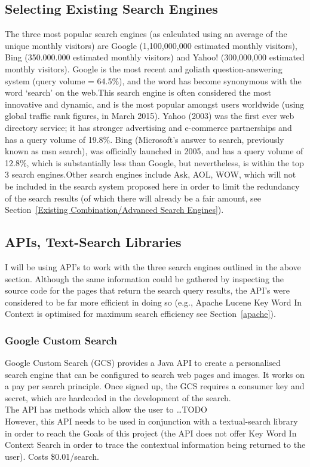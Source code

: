 \documentclass[10pt]{article}
\begin{document}
\subsection{Selecting Existing Search Engines}
The three most popular search engines (as calculated using an average of the unique monthly visitors) are Google (1,100,000,000 estimated monthly visitors), Bing (350.000.000 estimated monthly visitors) and Yahoo! (300,000,000 estimated monthly visitors)\cite{ebiz}. Google is the most recent and goliath question-answering system (query volume = 64.5\%)\cite{adam}, and the word has become synonymous with the word ‘search’ on the web.This search engine is often considered the most innovative and dynamic, and is the most popular amongst users worldwide (using global traffic rank figures, in March 2015). Yahoo (2003) was the first ever web directory service; it has stronger advertising and e-commerce partnerships and has a query volume of 19.8\%. Bing (Microsoft’s answer to search, previously known as msn search), was officially launched in 2005, and has a query volume of 12.8\%, which is substantially less than Google, but nevertheless, is within the top 3 search engines.Other search engines include Ask, AOL, WOW, which will not be included in the search system proposed here in order to limit the redundancy of the search results (of which there will already be a fair amount, see Section~\ref{Existing Combination/Advanced Search Engines}). 

\subsection{APIs, Text-Search Libraries}
I will be using API’s to work with the three search engines outlined in the above section. Although the same information could be gathered by inspecting the source code for the pages that return the search query results, the API’s were considered to be far more efficient in doing so (e.g., Apache Lucene Key Word In Context is optimised for maximum search efficiency see Section~\ref{apache}). 

\subsubsection{Google Custom Search}
Google Custom Search (GCS) provides a Java API to create a personalised search engine that can be configured to search web pages and images. It works on a pay per search principle. Once signed up, the GCS requires a consumer key and secret, which are hardcoded in the development of the search.\\
The API has methods which allow the user to …TODO\\
However, this API needs to be used in conjunction with a textual-search library in order to reach the Goals of this project (the API does not offer Key Word In Context Search in order to trace the contextual information being returned to the user). Costs \$0.01/search.
\end{document}
